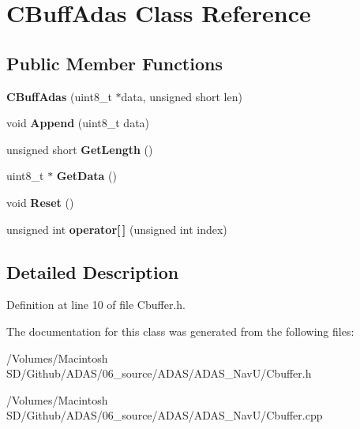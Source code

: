 \hypertarget{class_c_buff_adas}{}\section{C\+Buff\+Adas Class Reference}
\label{class_c_buff_adas}
\subsection*{Public Member Functions}
\begin{DoxyCompactItemize}
\item 
\mbox{\label{class_c_buff_adas_afb14758fc413199161d48963a83edadb}} 
{\bfseries C\+Buff\+Adas} (uint8\+\_\+t $\ast$data, unsigned short len)
\item 
\mbox{\label{class_c_buff_adas_ad131824caddc2ee1b90a629e4c30f215}} 
void {\bfseries Append} (uint8\+\_\+t data)
\item 
\mbox{\label{class_c_buff_adas_aa17f6536175e0aafe8ab7b307decf279}} 
unsigned short {\bfseries Get\+Length} ()
\item 
\mbox{\label{class_c_buff_adas_a56fdcdc9766874d3a6fef04119ee91f9}} 
uint8\+\_\+t $\ast$ {\bfseries Get\+Data} ()
\item 
\mbox{\label{class_c_buff_adas_a2ff1ee5f1dfa56117d76b17027d7b7e8}} 
void {\bfseries Reset} ()
\item 
\mbox{\label{class_c_buff_adas_aedceb4a4bcc47b6e4150a821f0494862}} 
unsigned int {\bfseries operator\mbox{[}$\,$\mbox{]}} (unsigned int index)
\end{DoxyCompactItemize}


\subsection{Detailed Description}


Definition at line 10 of file Cbuffer.\+h.



The documentation for this class was generated from the following files\+:\begin{DoxyCompactItemize}
\item 
/\+Volumes/\+Macintosh S\+D/\+Github/\+A\+D\+A\+S/06\+\_\+source/\+A\+D\+A\+S/\+A\+D\+A\+S\+\_\+\+Nav\+U/Cbuffer.\+h\item 
/\+Volumes/\+Macintosh S\+D/\+Github/\+A\+D\+A\+S/06\+\_\+source/\+A\+D\+A\+S/\+A\+D\+A\+S\+\_\+\+Nav\+U/Cbuffer.\+cpp\end{DoxyCompactItemize}
